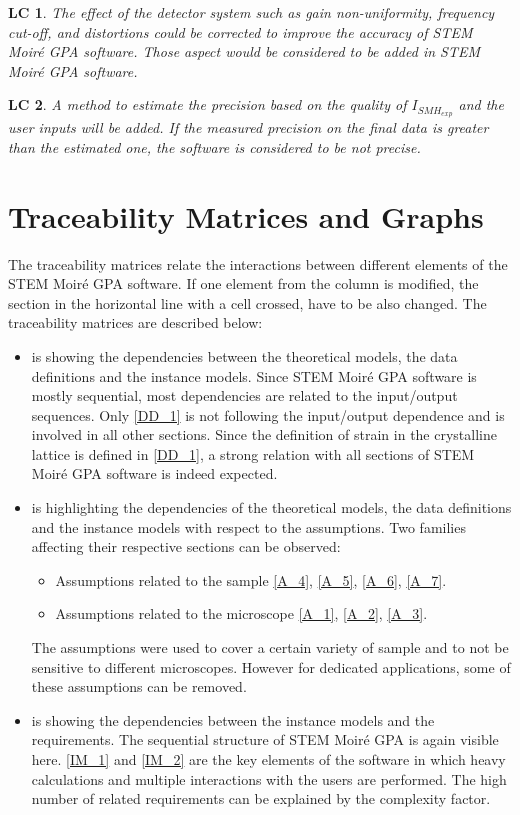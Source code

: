 \documentclass[12pt]{article}
\newcommand{\progname}{STEM Moir{\'e} GPA}
\newtheorem{LC}{LC}
\begin{document}
\begin{LC}
\label{LC_3}
\normalfont The effect of the detector system such as gain non-uniformity, frequency cut-off, and distortions could be corrected to improve the accuracy of \progname{} software. Those aspect would be considered to be added in \progname{} software.
\end{LC}

\begin{LC}
\label{LC_4}
\normalfont A method to estimate the precision based on the quality of $I_{SMH_{exp}}$ and the user inputs will be added. If the measured precision on the final data is greater than the estimated one, the software is considered to be not precise. 
\end{LC}

\section{Traceability Matrices and Graphs}

The traceability matrices relate the interactions between different elements of the \progname{} software. If one element from the column is modified, the section in the horizontal line with a cell crossed, have to be also changed. The traceability matrices are described below:
\begin{itemize}
\item{} is showing the dependencies between the theoretical models, the data definitions and the instance models. Since \progname{} software is mostly sequential, most dependencies are related to the input/output sequences. Only \cref{DD_1} is not following the input/output dependence and is involved in all other sections. Since the definition of strain in the crystalline lattice is defined in \cref{DD_1}, a strong relation with all sections of \progname{} software is indeed expected.
\item {} is highlighting the dependencies of the theoretical models, the data definitions and the instance models with respect to the assumptions. Two families affecting their respective sections can be observed:
\begin{itemize}
\item Assumptions related to the sample \cref{A_4}, \cref{A_5}, \cref{A_6}, \cref{A_7}. 
\item Assumptions related to the microscope \cref{A_1}, \cref{A_2}, \cref{A_3}.
\end{itemize}
The assumptions were used to cover a certain variety of sample and to not be sensitive to different microscopes. However for dedicated applications, some of these assumptions can be removed.
\item {} is showing the dependencies between the instance models and the requirements. The sequential structure of \progname{} is again visible here. \cref{IM_1} and \cref{IM_2} are the key elements of the software in which heavy calculations and multiple interactions with the users are performed. The high number of related requirements can be explained by the complexity factor.
\end{itemize}
\end{document}
